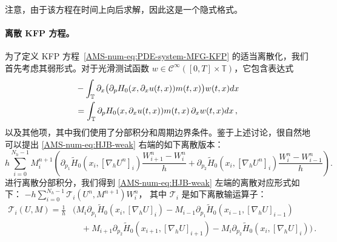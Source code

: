 \documentclass{amsproc}
\theoremstyle{definition}
\theoremstyle{remark}
\numberwithin{equation}{section}
\newcommand{\TT}{{\mathbb T}}
\newcommand{\grad}{\nabla}
\begin{document}
注意，由于该方程在时间上向后求解，因此这是一个隐式格式。



\paragraph{\textbf{离散 KFP 方程。} } \label{AMS-num-sec:textbfd-kfp-equat}
为了定义 KFP 方程~\eqref{AMS-num-eq:PDE-system-MFG-KFP} 的适当离散化，我们首先考虑其弱形式。对于光滑测试函数 $w \in \mathcal{C}^{\infty}([0,T] \times \TT)$，它包含表达式
\begin{align}
	&- \int_{\TT} \partial_x \big( \partial_p H_0(x, \partial_x u(t,x)) m(t,x)\big) w(t,x) dx
	\notag
	\\
	&=
	\int_{\TT} \partial_p H_0(x, \partial_x u(t,x)) m(t,x) \, \partial_x w(t,x) dx  \, ,
	\label{AMS-num-eq:HJB-weak}
\end{align}
以及其他项，其中我们使用了分部积分和周期边界条件。鉴于上述讨论，很自然地可以提出 \eqref{AMS-num-eq:HJB-weak} 右端的如下离散版本：
\begin{displaymath}
 h \sum_{i=0}^{N_h-1} M_i^{n+1} \left(  \partial_{p_1} \tilde{H}_0(x_i, [\grad_h U^n]_i)  \frac { W^n_{i+1}-W^n_i} h+
    \partial_{p_2} \tilde{H}_0(x_i, [\grad_h U^n]_i)  \frac { W^n_{i}-W^n_{i-1}} h   \right).
\end{displaymath}
进行离散分部积分，我们得到 \eqref{AMS-num-eq:HJB-weak} 左端的离散对应形式如下：
$ \displaystyle -
  h \sum_{i=0}^{N_h-1}  	\mathcal{T}_i(U^n , M^{n+1}) W_i^n$，
其中 $\mathcal{T}_i$ 是如下离散输运算子：
\begin{align*}
	\mathcal{T}_i(U, M)
	= \frac{1}{h} 
	&\Big( M_i  \partial_{p_1} \tilde{H}_0(x_i, [\grad_h U]_i) 
		- M_{i-1} \partial_{p_1} \tilde{H}_0(x_{i-1}, [\grad_h U]_{i-1})
		\\
		&\quad +
		M_{i+1} \partial_{p_2} \tilde{H}_0(x_{i+1}, [\grad_h U]_{i+1})
		- M_i \partial_{p_2} \tilde{H}_0(x_i, [\grad_h U]_i)
	\Big) \, .
\end{align*}
\end{document}
